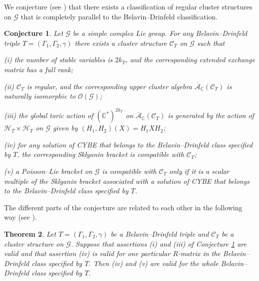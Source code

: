 \documentclass{amsart}
\newtheorem{theorem}{Theorem}
\newtheorem{conjecture}[theorem]{Conjecture}
\theoremstyle{definition}
\theoremstyle{remark}
\numberwithin{equation}{section}
\numberwithin{theorem}{section}
\begin{document}
We conjecture (see \cite[Conjecture~3.2]{GSVMMJ}) that there exists a classification of regular cluster structures on ${{\mathcal G}}$ that is completely
parallel to the Belavin--Drinfeld classification.

\begin{conjecture}
\label{ulti}
Let ${{\mathcal G}}$ be a simple complex Lie group.
For any Belavin--Drinfeld triple $T=(\Gamma_1,\Gamma_2,\gamma)$ there exists a cluster structure
${{\mathcal C}}_T$ on ${{\mathcal G}}$ such that

{\rm (i)}
the number of stable variables is $2k_T$, and the corresponding extended exchange matrix has a full rank; 

{\rm (ii)} ${{\mathcal C}}_T$ is regular, and the corresponding upper cluster algebra ${\overline{{\mathcal A}}}_{{\mathbb C}}({{\mathcal C}}_T)$ 
is naturally isomorphic to ${{\mathcal O}}({{\mathcal G}})$;

{\rm (iii)} the global toric action of $(\mathbb{C}^*)^{2k_T}$ on ${\overline{{\mathcal A}}}_{{\mathbb C}}({{\mathcal C}}_T)$  is generated by the action
of ${\mathcal H}_T\times {\mathcal H}_T$ on ${{\mathcal G}}$ given by $(H_1, H_2)(X) = H_1 X H_2$;

 {\rm (iv)} for any solution of CYBE that belongs to the Belavin--Drinfeld class specified  by $T$, the corresponding Sklyanin bracket is compatible with ${{\mathcal C}}_T$;

{\rm (v)} a Poisson--Lie bracket on ${{\mathcal G}}$ is compatible with ${{\mathcal C}}_T$ only if it is a scalar multiple
of the Sklyanin bracket associated with a solution of CYBE that belongs to the Belavin--Drinfeld class specified  by $T$.
\end{conjecture}

The different parts of the conjecture are related to each other in the following way 
(see \cite[Theorem~4.1]{GSVMMJ}).

\begin{theorem}
\label{partial}
Let $T=(\Gamma_1, \Gamma_2,\gamma)$ be a Belavin--Drinfeld triple and ${{\mathcal C}}_T$ be a cluster structure
on ${{\mathcal G}}$.
Suppose that assertions {\rm(i)} and {\rm(iii)} of Conjecture {\rm\ref{ulti}} are valid and that 
assertion {\rm(iv)} is valid for one particular R-matrix in the Belavin--Drinfeld 
class specified  by $T$. Then {\rm(iv)} and {\rm(v)} are valid for the whole Belavin--Drinfeld class specified  
by $T$.
\end{theorem}
\end{document}
